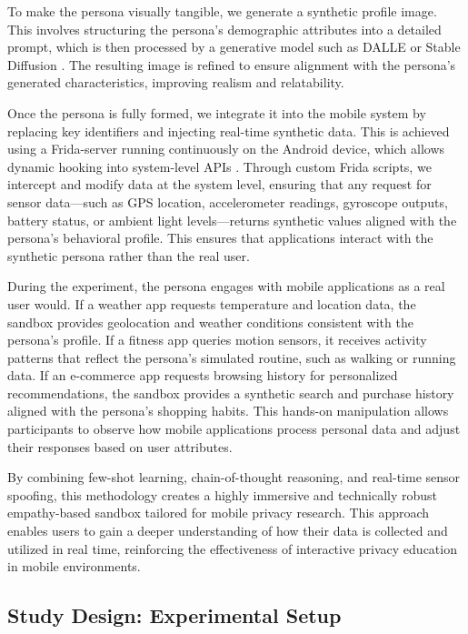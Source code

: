 \documentclass[acmlarge, nonacm]{acmart}
\begin{document}
To make the persona visually tangible, we generate a synthetic profile image. This involves structuring the persona’s demographic attributes into a detailed prompt, which is then processed by a generative model such as DALLE \cite{dalle} or Stable Diffusion \cite{stablediffusion}. The resulting image is refined to ensure alignment with the persona’s generated characteristics, improving realism and relatability.

Once the persona is fully formed, we integrate it into the mobile system by replacing key identifiers and injecting real-time synthetic data. This is achieved using a Frida-server running continuously on the Android device, which allows dynamic hooking into system-level APIs \cite{frida}. Through custom Frida scripts, we intercept and modify data at the system level, ensuring that any request for sensor data—such as GPS location, accelerometer readings, gyroscope outputs, battery status, or ambient light levels—returns synthetic values aligned with the persona's behavioral profile. This ensures that applications interact with the synthetic persona rather than the real user.

During the experiment, the persona engages with mobile applications as a real user would. If a weather app requests temperature and location data, the sandbox provides geolocation and weather conditions consistent with the persona’s profile. If a fitness app queries motion sensors, it receives activity patterns that reflect the persona’s simulated routine, such as walking or running data. If an e-commerce app requests browsing history for personalized recommendations, the sandbox provides a synthetic search and purchase history aligned with the persona’s shopping habits. This hands-on manipulation allows participants to observe how mobile applications process personal data and adjust their responses based on user attributes.

By combining few-shot learning, chain-of-thought reasoning, and real-time sensor spoofing, this methodology creates a highly immersive and technically robust empathy-based sandbox tailored for mobile privacy research. This approach enables users to gain a deeper understanding of how their data is collected and utilized in real time, reinforcing the effectiveness of interactive privacy education in mobile environments.


\subsection{Study Design: Experimental Setup}
\end{document}
